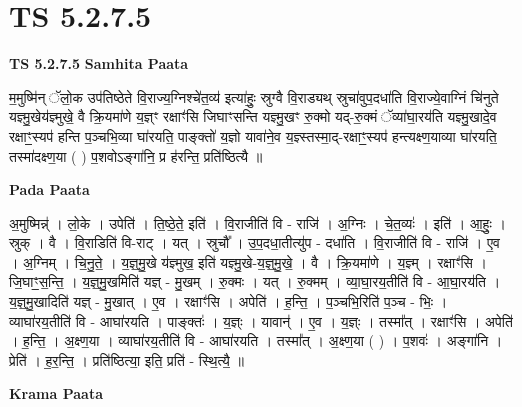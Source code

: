 \documentclass[17pt]{extarticle}
\begin{document}
\section{ TS 5.2.7.5 }

\textbf{TS 5.2.7.5 } \newline
\textbf{Samhita Paata} \newline

म॒मुष्मि॑न् ॅलो॒क उप॑तिष्ठेते वि॒राज्य॒ग्निश्चे॑त॒व्य॑ इत्या॑हुः॒ स्रुग्वै वि॒राड्यथ् स्रुचा॑वुप॒दधा॑ति वि॒राज्ये॒वाग्निं चि॑नुते यज्ञ्मु॒खेय॑ज्ञ्मुखे॒ वै क्रि॒यमा॑णे य॒ज्ञ्ꣳ रक्षाꣳ॑सि जिघाꣳसन्ति यज्ञ्मु॒खꣳ रु॒क्मो यद्-रु॒क्मं ॅव्या॑घा॒रय॑ति यज्ञ्मु॒खादे॒व रक्षाꣳ॒॒स्यप॑ हन्ति प॒ञ्चभि॒व्या घा॑रयति॒ पाङ्क्तो॑ य॒ज्ञो यावा॑ने॒व य॒ज्ञ्स्तस्मा॒द्-रक्षाꣳ॒॒स्यप॑ हन्त्यक्ष्ण॒याव्या घा॑रयति॒ तस्मा॑दक्ष्ण॒या ( ) प॒शवोऽङ्गा॑नि॒ प्र ह॑रन्ति॒ प्रति॑ष्ठित्यै ॥ \newline

\textbf{Pada Paata} \newline

अ॒मुष्मिन्न्॑ । लो॒के । उपेति॑ । ति॒ष्ठे॒ते॒ इति॑ । वि॒राजीति॑ वि - राजि॑ । अ॒ग्निः । चे॒त॒व्यः॑ । इति॑ । आ॒हुः॒ । स्रुक् । वै । वि॒राडिति॑ वि-राट् । यत् । स्रुचौ᳚ । उ॒प॒दधा॒तीत्यु॑प - दधा॑ति । वि॒राजीति॑ वि - राजि॑ । ए॒व । अ॒ग्निम् । चि॒नु॒ते॒ । य॒ज्ञ्॒मु॒खे य॑ज्ञ्मुख॒ इति॑ यज्ञ्मु॒खे-य॒ज्ञ्॒मु॒खे॒ । वै । क्रि॒यमा॑णे । य॒ज्ञ्म् । रक्षाꣳ॑सि । जि॒घाꣳ॒॒स॒न्ति॒ । य॒ज्ञ्॒मु॒खमिति॑ यज्ञ् - मु॒खम् । रु॒क्मः । यत् । रु॒क्मम् । व्या॒घा॒रय॒तीति॑ वि - आ॒घा॒रय॑ति । य॒ज्ञ्॒मु॒खादिति॑ यज्ञ् - मु॒खात् । ए॒व । रक्षाꣳ॑सि । अपेति॑ । ह॒न्ति॒ । प॒ञ्चभि॒रिति॑ प॒ञ्च - भिः॒ । व्याघा॑रय॒तीति॑ वि - आघा॑रयति । पाङ्क्तः॑ । य॒ज्ञ्ः । यावान्॑ । ए॒व । य॒ज्ञ्ः । तस्मा᳚त् । रक्षाꣳ॑सि । अपेति॑ । ह॒न्ति॒ । अ॒क्ष्ण॒या । व्याघा॑रय॒तीति॑ वि - आघा॑रयति । तस्मा᳚त् । अ॒क्ष्ण॒या ( ) । प॒शवः॑ । अङ्गा॑नि । प्रेति॑ । ह॒र॒न्ति॒ । प्रति॑ष्ठित्या॒ इति॒ प्रति॑ - स्थि॒त्यै॒ ॥  \newline


\textbf{Krama Paata} \newline
\end{document}
